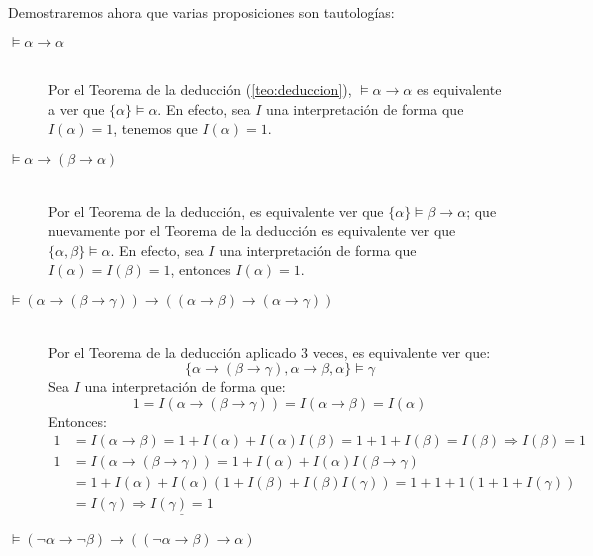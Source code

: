 \begin{ejemplo}
    Demostraremos ahora que varias proposiciones son tautologías:
    \begin{description}
        \item [$\vDash\alpha\to\alpha$]~\\
            Por el Teorema de la deducción (\ref{teo:deduccion}), $\vDash\alpha\to\alpha$ es equivalente a ver que $\{\alpha\}\vDash\alpha$. En efecto, sea $I$ una interpretación de forma que $I(\alpha)=1$, tenemos que $I(\alpha)=1$.
        \item [$\vDash\alpha\to(\beta\to\alpha)$]~\\
            Por el Teorema de la deducción, es equivalente ver que $\{\alpha\}\vDash \beta\to\alpha$; que nuevamente por el Teorema de la deducción es equivalente ver que $\{\alpha,\beta\}\vDash \alpha$. En efecto, sea $I$ una interpretación de forma que $I(\alpha)=I(\beta)=1$, entonces $I(\alpha)=1$.
        \item [$\vDash(\alpha\to(\beta\to\gamma))\to((\alpha\to\beta)\to(\alpha\to\gamma))$]~\\
            Por el Teorema de la deducción aplicado 3 veces, es equivalente ver que:
            \begin{equation*}
                \{\alpha\to(\beta\to\gamma),\alpha\to\beta,\alpha\}\vDash \gamma
            \end{equation*}
            Sea $I$ una interpretación de forma que:
            \begin{equation*}
                1 = I(\alpha\to(\beta\to\gamma)) = I(\alpha\to\beta) = I(\alpha)
            \end{equation*}
            Entonces:
            \begin{align*}
                1 &= I(\alpha\to\beta) = 1 + I(\alpha) + I(\alpha)I(\beta) = 1 + 1 + I(\beta) = I(\beta) \Longrightarrow I(\beta) = 1 \\
                1 &= I(\alpha\to(\beta\to\gamma)) = 1 + I(\alpha) + I(\alpha)I(\beta\to\gamma) \\
                  &= 1 + I(\alpha) + I(\alpha)(1 + I(\beta) + I(\beta)I(\gamma)) = 1 + 1 + 1(1 + 1 + I(\gamma))  \\
                  &= I(\gamma) \Longrightarrow \underline{I(\gamma) = 1}
            \end{align*}
        \item [$\vDash(\lnot\alpha\to\lnot\beta) \to ((\lnot\alpha\to\beta)\to \alpha)$]~\\

\end{description}
\end{ejemplo}
